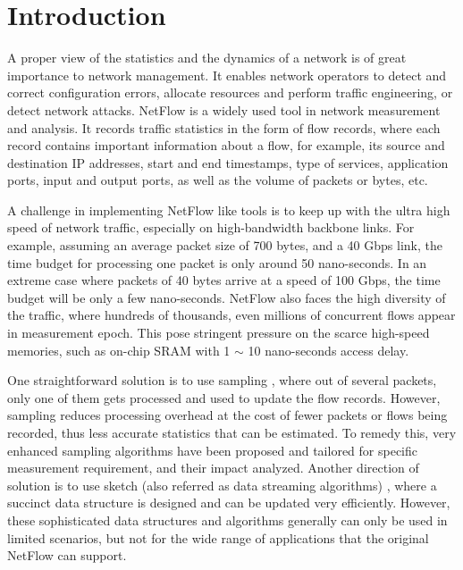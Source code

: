 \section{Introduction}
\label{section:introduction}
A proper view of the statistics and the dynamics of a network is of great importance to network management.
It enables network operators to detect and correct configuration errors, 
allocate resources and perform  traffic engineering, or detect network attacks. 
NetFlow\cite{claise_cisco_2004} is a widely used tool in network measurement and analysis.
It records traffic statistics in the form of flow records, where each record contains important 
information about a flow, for example, its source and destination IP addresses, 
start and end timestamps,  type of services, application ports, input and output ports, 
as well as the volume of packets or bytes, etc. 

A challenge in implementing NetFlow like tools is to keep up with the ultra high speed 
of network traffic, especially on high-bandwidth backbone links. For example, assuming an 
average packet size of 700 bytes, and a 40 Gbps link, the time budget for processing 
one packet is only around 50 nano-seconds. In an extreme case where packets of 40 bytes 
arrive at a speed of 100 Gbps, the time budget will be only a few nano-seconds. 
NetFlow also faces the high diversity of the traffic, where hundreds of thousands, 
even millions of concurrent flows appear in measurement epoch. This pose stringent 
pressure on the scarce high-speed memories, such as on-chip SRAM with 1 $\sim$ 10 nano-seconds 
access delay\cite{li_flowradar:_2016}\cite{noauthor_access_nodate}.

One straightforward solution is to use sampling \cite{noauthor_sampled_nodate}, 
where out of several packets, only one of them gets processed and used to update the flow records.
However, sampling reduces processing overhead at the cost of fewer packets or flows being recorded, 
thus less accurate statistics that can be estimated. To remedy this, very enhanced sampling algorithms
\cite{hohn_inverting_2003}\cite{duffield_estimating_2005}\cite{tune_towards_2008}
have been proposed and tailored for specific measurement requirement, 
and their impact analyzed\cite{duffield2004}\cite{SamplingImpact}.
Another direction of solution is to use sketch (also referred as data streaming algorithms)
\cite{DataStreams2005}\cite{huang_sketchvisor:_2017}\cite{chen_counter_2017},
where a succinct data structure is designed and can be updated very efficiently. 
However, these sophisticated data structures and algorithms generally can only be used in limited scenarios, 
but not for the wide range of applications that the original NetFlow can support.

